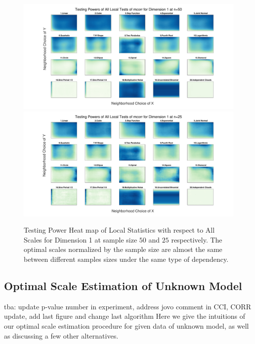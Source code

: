\documentclass[11pt]{article}
\begin{document}
\begin{figure}[htbp]
\includegraphics[width=1.0\textwidth]{../Figures/Fig2b}
\includegraphics[width=1.0\textwidth]{../Figures/Fig2c}
\caption{Testing Power Heat map of Local Statistics with respect to All Scales for Dimension 1 at sample size $50$ and $25$ respectively. The optimal scales normalized by the sample size are almost the same between different samples sizes under the same type of dependency. }
\label{figSim2a}
\end{figure}

\subsection{Optimal Scale Estimation of Unknown Model}
\label{appen:discuss}
tba: update p-value number in experiment, address jovo comment in CCI, CORR update, add last figure and change last algorithm
Here we give the intuitions of our optimal scale estimation procedure for given data of unknown model, as well as discussing a few other alternatives.
\end{document}
